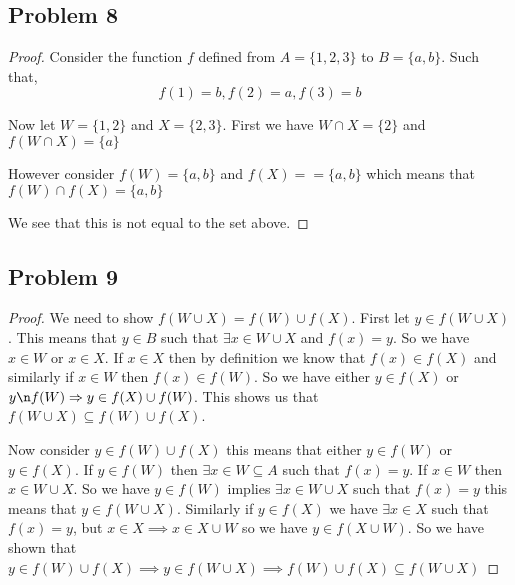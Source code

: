 \documentclass[a4paper]{report}
\begin{document}
\subsection*{Problem 8}
\begin{proof}
    Consider the function $f$ defined from $A = \{1,2,3\}$ to $B = \{a,b\}$. Such that, 
    $$ f(1) = b, f(2) = a, f(3) = b $$ 

    Now let $W = \{1,2\}$ and  $X = \{2,3\}$. First we have  $W \cap X = \{2\}$ and  $f(W \cap X) = \{a\} $

    However consider  $f(W) = \{a,b\}$ and  $f(X) = =\{a,b\}$ which means that  $f(W) \cap f(X) = \{a,b\}$

    We see that this is not equal to the set above.
\end{proof}

\subsection*{Problem 9}
\begin{proof}
    We need to show $f(W\cup X) = f(W) \cup f(X)$. First let  $y \in f(W \cup X)$. This means that $y \in B$ such that $\exists x \in W \cup X$ and $f(x) = y$.  So  we have  $x \in W$ or $x \in X$. If $x \in X$ then by definition we know that $f(x) \in f(X)$ and similarly if $x \in W$ then $f(x) \in f(W)$. So we have either  $y \in f(X)$ or $y \n f(W) \implies y \in f(X) \cup f(W)$. This shows us that $f(W \cup X) \subseteq f(W) \cup f(X)$.


    Now consider  $y \in f(W) \cup f(X)$ this means that either $y \in f(W)$ or $y \in f(X)$. If  $y \in f(W)$ then $\exists x \in W \subseteq A$ such that $f(x) = y$. If $x \in W$ then $x \in W \cup X$. So we have $y \in f(W)$ implies $\exists x \in W \cup X$ such that $f(x) = y$ this means that $y \in f(W \cup X)$. Similarly if  $y \in f(X)$ we have $\exists x \in X$ such that $f(x) = y$, but  $x \in X  \implies x \in X \cup W$ so we have $y \in f(X \cup W)$. So we have shown that  $y \in f(W) \cup f(X) \implies y \in f(W\cup X) \implies f(W) \cup f(X) \subseteq f(W\cup X)$
\end{proof}
\end{document}
